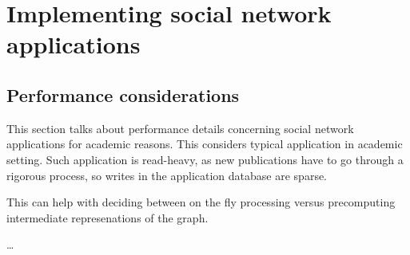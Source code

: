 \chapter{Implementing social network applications}

\section{Performance considerations}

This section talks about performance details concerning social network applications for academic reasons. This considers typical application in academic setting. Such application is read-heavy, as new publications have to go through a rigorous process, so writes in the application database are sparse.

This can help with deciding between on the fly processing versus precomputing intermediate represenations of the graph. 


\dots
